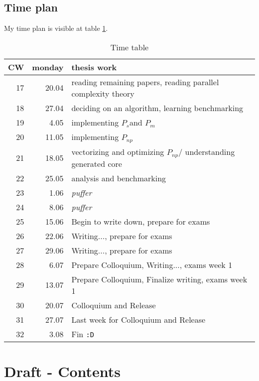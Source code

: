 \documentclass{article}
\newcommand{\seq}[0]{$P_{s}$}
\renewcommand{\mp}[0]{$P_{m}$}
\newcommand{\ndp}[0]{$P_{np}$}
\begin{document}
\begin{itemize}
    \subsection{Time plan}
    My time plan is visible at table \ref{timetable}.
    \begin{table}[h]
        \begin{center}
        \caption{Time table} %
        \label{timetable}
        \begin{tabular}{rrl}
            \toprule
            CW & monday & thesis work \\
            \midrule
            17 & 20.04 & reading remaining papers, reading parallel complexity theory \\
            18 & 27.04 & deciding on an algorithm, learning benchmarking  \\
            19 & 4.05  & implementing \seq and \mp \\
            20 & 11.05 & implementing \ndp \\
            21 & 18.05 & vectorizing and optimizing \ndp / understanding generated core \\
            22 & 25.05 & analysis and benchmarking \\
            23 & 1.06  & \textit{puffer} \\
            24 & 8.06  & \textit{puffer} \\
            25 & 15.06 & Begin to write down, prepare for exams\\
            26 & 22.06 & Writing..., prepare for exams \\
            27 & 29.06 & Writing..., prepare for exams \\
            28 & 6.07  & Prepare Colloquium, Writing..., exams week 1 \\
            29 & 13.07 & Prepare Colloquium, Finalize writing, exams week 1 \\
            30 & 20.07 & Colloquium and Release \\
            31 & 27.07 & Last week for Colloquium and Release \\
            32 & 3.08  & Fin \texttt{:D} \\
        \end{tabular}
        \end{center}
    \end{table}

    \section{Draft - Contents}


\end{itemize}
\end{document}
